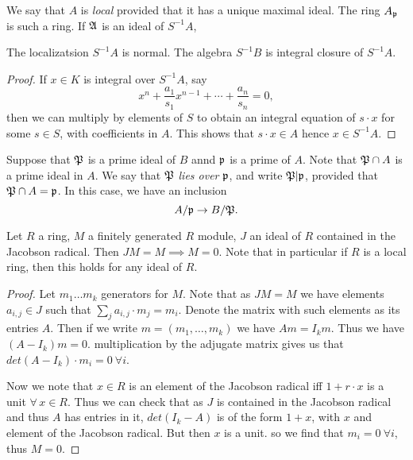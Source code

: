 We say that $A$ is \emph{local} provided that it has a unique maximal ideal.
The ring $A_{\mathfrak{p}}$ is such a ring.
If $\mathfrak{A}$ is an ideal of $S^{-1}A$, 

\begin{proposition}
  The localizatsion $S^{-1}A$ is normal.
  The algebra $S^{-1}B$ is integral closure of $S^{-1}A$.
\end{proposition}
\begin{proof}
  If $x \in K$ is integral over $S^{-1}A$, say
  \[ x^{n} + \frac{a_{1}}{s_{1}} x^{n-1} + \cdots + \frac{a_{n}}{s_{n}} = 0, \]
  then we can multiply by elements of $S$ to obtain an integral equation of $s \cdot x$ for some $s \in S$, with coefficients in $A$.
  This shows that $s \cdot x \in A$ hence $x \in S^{-1} A$.
\end{proof}

Suppose that $\mathfrak{P}$ is a prime ideal of $B$ annd $\mathfrak{p}$ is a prime of $A$.
Note that $\mathfrak{P} \cap A$ is a prime ideal in $A$.
We say that $\mathfrak{P}$ \emph{lies over} $\mathfrak{p}$, and write $\mathfrak{P} | \mathfrak{p}$, provided that $\mathfrak{P} \cap A = \mathfrak{p}$.
In this case, we have an inclusion
\[ A/\mathfrak{p} \to B/\mathfrak{P}. \]


\begin{lemma}\label{lemma:nakayama}
  Let $R$ a ring, $M$ a finitely generated $R$ module, $J$ an ideal of $R$ contained in the Jacobson radical. Then $JM = M \implies M = 0$. 
  Note that in particular if $R$ is a local ring, then this holds for any ideal of $R$.
\end{lemma}
\begin{proof}
  Let $m_1\ldots m_k$ generators for $M$. Note that as $JM = M$ we have elements $a_{i,j} \in J$ such that $\sum_j a_{i,j}\cdot m_j = m_i$.
  Denote the matrix with such elements as its entries $A$. Then if we write $m = (m_1,\ldots ,m_k)$ we have $Am = I_km$.
  Thus we have $(A-I_k)m = 0$. multiplication by the adjugate matrix gives us that $det(A-I_k)\cdot m_i = 0 \ \forall i$.

  Now we note that $x \in R$ is an element of the Jacobson radical iff $1 + r\cdot x$ is a unit $\forall \, x \in R$. 
  Thus we can check that as $J$ is contained in the Jacobson radical and thus $A$ has entries in it, $det(I_k-A)$ is of the form $1 + x$, with $x$ and element of the Jacobson radical.
  But then $x$ is a unit. so we find that $m_i = 0 \ \forall i$, thus $M = 0$.
  
\end{proof}


